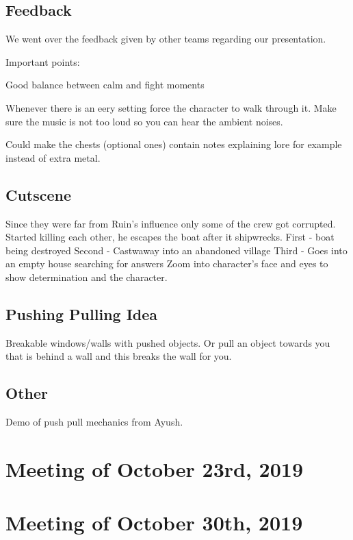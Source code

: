 \documentclass{article}
\begin{document}
\subsection{Feedback}
We went over the feedback given by other teams regarding our presentation.

Important points:
\begin{description}
\item Good balance between calm and fight moments
\item Whenever there is an eery setting force the character to walk through it. Make sure the music is not too loud so you can hear the ambient noises.
\item Could make the chests (optional ones) contain notes explaining lore for example instead of extra metal.
\end{description}

\subsection{Cutscene}
Since they were far from Ruin's influence only some of the crew got corrupted. Started killing each other, he escapes the boat after it shipwrecks. 
First - boat being destroyed
Second - Castwaway into an abandoned village
Third - Goes into an empty house searching for answers
Zoom into character's face and eyes to show determination and the character.

\subsection{Pushing Pulling Idea}
Breakable windows/walls with pushed objects. Or pull an object towards you that is behind a wall and this breaks the wall for you.

\subsection{Other}
Demo of push pull mechanics from Ayush.










\section{Meeting of October 23rd, 2019}

\section{Meeting of October 30th, 2019}
\end{document}
